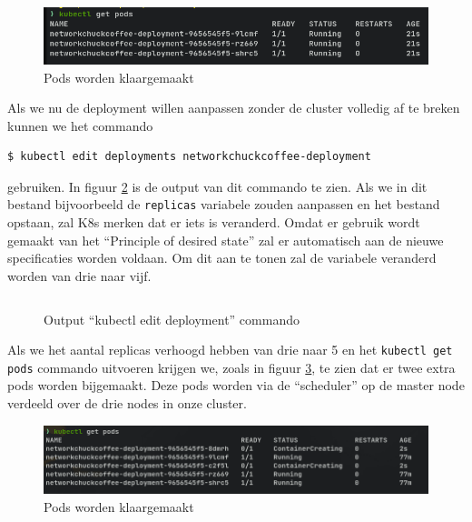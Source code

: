 \begin{figure}[h]
	\centering
	\includegraphics[width=\linewidth]{img/kubectlGetPodsDeployment1.png}
	\caption{Pods worden klaargemaakt}
	\label{fig:getPodsDeployment1}
\end{figure}

Als we nu de deployment willen aanpassen zonder de cluster volledig af te breken kunnen we het commando 
\begin{verbatim} 
$ kubectl edit deployments networkchuckcoffee-deployment
\end{verbatim}
gebruiken. In figuur \ref{editDeploy1} is de output van dit commando te zien. Als we in dit bestand bijvoorbeeld de \verb|replicas| variabele zouden aanpassen en het bestand opstaan, zal K8s merken dat er iets is veranderd. Omdat er gebruik wordt gemaakt van het ``Principle of desired state'' zal er automatisch aan de nieuwe specificaties worden voldaan. Om dit aan te tonen zal de variabele veranderd worden van drie naar vijf.


\begin{figure}[h] 
	\inputminted[fontsize=\footnotesize,linenos]{yaml}{files/editDeployment.yaml}
	\caption{Output ``kubectl edit deployment'' commando}
	\label{editDeploy1}
\end{figure}

Als we het aantal replicas verhoogd hebben van drie naar 5 en het \verb|kubectl get pods| commando uitvoeren krijgen we, zoals in figuur \ref{fig:kubectlGetPodsEditDeploy1}, te zien dat er twee extra pods worden bijgemaakt. Deze pods worden via de ``scheduler'' op de master node verdeeld over de drie nodes in onze cluster.
\begin{figure}[h]
	\centering
	\includegraphics[width=\linewidth]{img/kubectlGetPodsEditDeploy1.png}
	\caption{Pods worden klaargemaakt}
	\label{fig:kubectlGetPodsEditDeploy1}
\end{figure}


